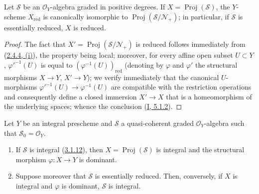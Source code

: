 \begin{proposition}[3.1.13]
\label{II.3.1.13}
Let $\mathcal{S}$ be an $\mathcal{O}_Y$-algebra graded in positive degrees.
If $X=\operatorname{Proj}(\mathcal{S})$, the $Y$-scheme $X_{\mathrm{red}}$ is
canonically isomorphic to $\operatorname{Proj}(\mathcal{S}/\mathcal{N}_+)$;
in particular, if $\mathcal{S}$ is essentially reduced, $X$ is reduced.
\end{proposition}

\begin{proof}
The fact that $X'=\operatorname{Proj}(\mathcal{S}/\mathcal{N}_+)$ is reduced
follows immediately from (\hyperref[II.2.4.4]{2.4.4, (i)}), the property
being local; moreover, for every affine open subset $U\subset Y$,
${\varphi'}^{-1}(U)$ is equal to $(\varphi^{-1}(U))_{\mathrm{red}}$ (denoting
by $\varphi$ and $\varphi'$ the structural morphisms $X\to Y$,
$X'\to Y$); we verify immediately that the canonical $U$-morphisms
${\varphi'}^{-1}(U)\to\varphi^{-1}(U)$ are compatible with the restriction
operations and consequently define a closed immersion $X'\to X$ that is a
homeomorphism of the underlying spaces; whence the conclusion
(\hyperref[I.5.1.2]{I, 5.1.2}).
\end{proof}

\begin{proposition}[3.1.14]
\label{II.3.1.14}
Let $Y$ be an integral prescheme and $\mathcal{S}$ a quasi-coherent graded
$\mathcal{O}_Y$-algebra such that $\mathcal{S}_0=\mathcal{O}_Y$.
\begin{enumerate}
  \item[\rm(i)] If $\mathcal{S}$ is integral
    (\hyperref[II.3.1.12]{3.1.12}), then
    $X=\operatorname{Proj}(\mathcal{S})$ is integral and the structural
    morphism $\varphi:X\to Y$ is dominant.
  \item[\rm(ii)] Suppose moreover that $\mathcal{S}$ is essentially reduced.
    Then, conversely, if $X$ is integral and $\varphi$ is dominant,
    $\mathcal{S}$ is integral.
\end{enumerate}
\end{proposition}

